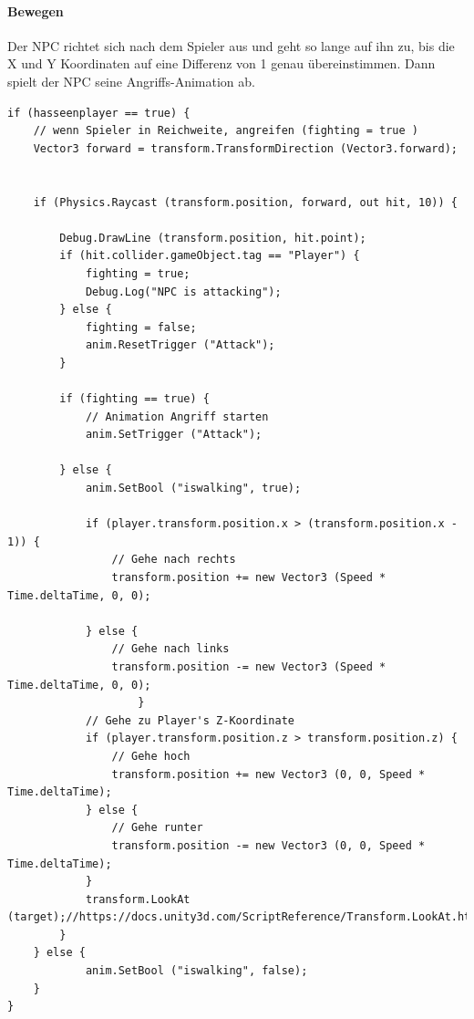 \paragraph{Bewegen }
Der NPC richtet sich nach dem Spieler aus und geht so lange auf ihn zu, bis die X und Y Koordinaten auf eine Differenz von 1 genau übereinstimmen.
Dann spielt der NPC seine Angriffs-Animation ab.
\begin{lstlisting}
if (hasseenplayer == true) {	
	// wenn Spieler in Reichweite, angreifen (fighting = true )
	Vector3 forward = transform.TransformDirection (Vector3.forward);

	
	if (Physics.Raycast (transform.position, forward, out hit, 10)) {	

		Debug.DrawLine (transform.position, hit.point);
		if (hit.collider.gameObject.tag == "Player") {
			fighting = true;
			Debug.Log("NPC is attacking");
		} else {
			fighting = false;
			anim.ResetTrigger ("Attack");
		}

		if (fighting == true) {
			// Animation Angriff starten
			anim.SetTrigger ("Attack");
			
		} else {	
			anim.SetBool ("iswalking", true);
					
			if (player.transform.position.x > (transform.position.x - 1)) {
				// Gehe nach rechts
				transform.position += new Vector3 (Speed * Time.deltaTime, 0, 0);
            		
			} else {
				// Gehe nach links
				transform.position -= new Vector3 (Speed * Time.deltaTime, 0, 0);
					}
			// Gehe zu Player's Z-Koordinate
			if (player.transform.position.z > transform.position.z) {
				// Gehe hoch
				transform.position += new Vector3 (0, 0, Speed * Time.deltaTime);
			} else {
				// Gehe runter
				transform.position -= new Vector3 (0, 0, Speed * Time.deltaTime);
			}
			transform.LookAt (target);//https://docs.unity3d.com/ScriptReference/Transform.LookAt.html
		}
	} else {
			anim.SetBool ("iswalking", false);
	}
}

\end{lstlisting}
